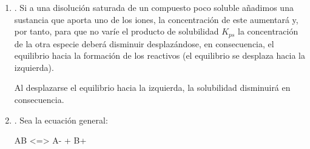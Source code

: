 \begin{enumerate}[label=\numberballmDarkTeal]
\item {}.
Si a una disolución saturada de un compuesto poco soluble añadimos una sustancia que aporta uno de los iones,  la concentración de este aumentará y, por tanto, para que no varíe el producto de solubilidad  \( K_{ps} \)  la concentración de la otra especie deberá disminuir desplazándose, en consecuencia, el equilibrio hacia la formación de los reactivos (el equilibrio se desplaza hacia la izquierda).

Al desplazarse el equilibrio hacia la izquierda, la solubilidad disminuirá en consecuencia.
%

\item {}.
Sea la ecuación general:
\begin{reaction*}
    AB \sld{} <=> A- \aq{} + B+ \aq{}
\end{reaction*}


\end{enumerate}
